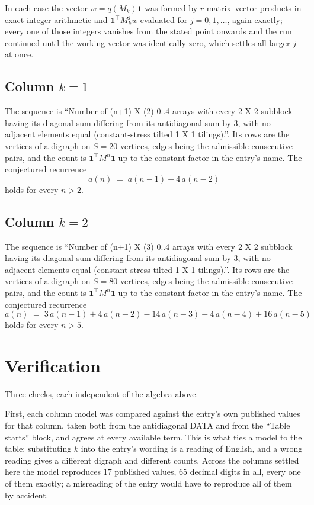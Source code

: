 \documentclass[11pt,a4paper]{article}
\theoremstyle{plain}
\theoremstyle{definition}
\begin{document}
In each case the vector $w=q(M_k)\mathbf{1}$ was formed by $r$ matrix--vector products in
exact integer arithmetic and $\mathbf{1}^{\!\top}M_k^{j}w$ evaluated for $j=0,1,\dots$,
again exactly; every one of those integers vanishes from the stated point onwards and the run
continued until the working vector was identically zero, which settles all larger $j$ at once.

\subsection*{Column $k=1$}
The sequence is ``Number of (n+1) X (2) 0..4 arrays with every 2 X 2 subblock having its diagonal sum differing from its antidiagonal sum by 3, with no adjacent elements equal (constant-stress tilted 1 X 1 tilings).''. Its rows are the vertices of a digraph on
$S=20$ vertices, edges being the admissible consecutive pairs, and the count is
$\mathbf{1}^{\!\top}M^{n}\mathbf{1}$ up to the constant factor in the entry's name.
The conjectured recurrence
\[
a(n)\;=\;a(n-1) + 4\,a(n-2)
\]
holds for every $n>2$.

\subsection*{Column $k=2$}
The sequence is ``Number of (n+1) X (3) 0..4 arrays with every 2 X 2 subblock having its diagonal sum differing from its antidiagonal sum by 3, with no adjacent elements equal (constant-stress tilted 1 X 1 tilings).''. Its rows are the vertices of a digraph on
$S=80$ vertices, edges being the admissible consecutive pairs, and the count is
$\mathbf{1}^{\!\top}M^{n}\mathbf{1}$ up to the constant factor in the entry's name.
The conjectured recurrence
\[
a(n)\;=\;3\,a(n-1) + 4\,a(n-2) - 14\,a(n-3) - 4\,a(n-4) + 16\,a(n-5)
\]
holds for every $n>5$.

\section{Verification}

Three checks, each independent of the algebra above.

First, each column model was compared against the entry's own published values for that
column, taken both from the antidiagonal DATA and from the ``Table starts'' block, and agrees
at every available term. This is what ties a model to the table: substituting $k$ into the
entry's wording is a reading of English, and a wrong reading gives a different digraph and
different counts. Across the columns settled here the model reproduces $17$ published
values, $65$ decimal digits in all, every one of them exactly; a misreading of the entry
would have to reproduce all of them by accident.
\end{document}
